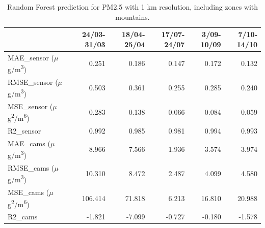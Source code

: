 \begin{table}[H]
\begin{tabular}{lrrrrr}
\toprule
 &  24/03-31/03 &  18/04-25/04 &  17/07-24/07 &  3/09-10/09 &  7/10-14/10 \\
\midrule
 MAE\_sensor ($\mu$g/m\textsuperscript{3})&        0.251 &        0.186 &        0.147 &       0.172 &       0.132 \\
RMSE\_sensor ($\mu$g/m\textsuperscript{3})&        0.503 &        0.361 &        0.255 &       0.285 &       0.240 \\
 MSE\_sensor ($\mu$g\textsuperscript{2}/m\textsuperscript{6})&        0.283 &        0.138 &        0.066 &       0.084 &       0.059 \\
  R2\_sensor &        0.992 &        0.985 &        0.981 &       0.994 &       0.993 \\
   MAE\_cams ($\mu$g/m\textsuperscript{3})&        8.966 &        7.566 &        1.936 &       3.574 &       3.974 \\
  RMSE\_cams ($\mu$g/m\textsuperscript{3})&       10.310 &        8.472 &        2.487 &       4.099 &       4.580 \\
   MSE\_cams ($\mu$g\textsuperscript{2}/m\textsuperscript{6})&      106.414 &       71.818 &        6.213 &      16.810 &      20.988 \\
    R2\_cams &       -1.821 &       -7.099 &       -0.727 &      -0.180 &      -1.578 \\
\bottomrule
\end{tabular}
\caption{Random Forest prediction for PM2.5 with 1 km resolution, including zones with mountains.}
\end{table}
